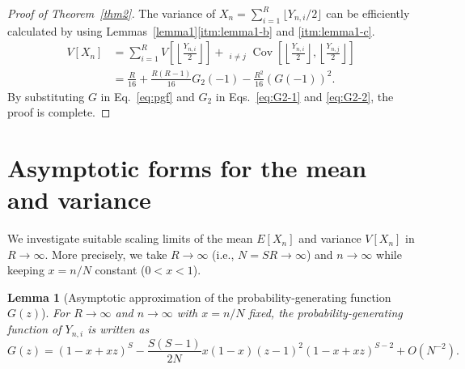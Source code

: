 \documentclass[pre, amsmath, floatfix]{revtex4-2}
\theoremstyle{plain}
\newtheorem{lemma}{Lemma}[section]
\theoremstyle{definition}
\theoremstyle{remark}
\newcommand{\E}[1]{E\left[#1\right]} %
\newcommand{\Var}[1]{V\left[#1\right]} %
\DeclareMathOperator{\cov}{Cov} %
\newcommand{\Cov}[2]{\cov\left[#1, #2\right]}
\newcommand{\Omicron}{O}
\begin{document}
\begin{proof}[Proof of Theorem~\ref{thm2}]
The variance of $X_n=\sum_{i=1}^R\lfloor Y_{n,i}/2\rfloor$ can be efficiently calculated by using Lemmas~\ref{lemma1}\ref{itm:lemma1-b} and \ref{itm:lemma1-c}.
\begin{align}
\Var{X_n}&=\sum_{i=1}^R \Var{\left\lfloor\frac{Y_{n,i}}{2}\right\rfloor}+\mathop{\sum_{i=1}^R\sum_{j=1}^R}_{i\ne j}\Cov{\left\lfloor\frac{Y_{n,i}}{2}\right\rfloor}{\left\lfloor\frac{Y_{n,j}}{2}\right\rfloor}\nonumber\\
&=\frac{R}{16}+\frac{R(R-1)}{16}G_2(-1)-\frac{R^2}{16}(G(-1))^2.
\label{eq:proof_V}
\end{align}
By substituting $G$ in Eq.~\eqref{eq:pgf} and $G_2$ in Eqs.~\eqref{eq:G2-1} and \eqref{eq:G2-2}, the proof is complete.
\end{proof}

\section{Asymptotic forms for the mean and variance}
We investigate suitable scaling limits of the mean $\E{X_n}$ and variance $\Var{X_n}$ in $R\to\infty$.
More precisely, we take $R\to\infty$ (i.e., $N=SR\to\infty$) and $n\to\infty$ while keeping $x=n/N$ constant ($0<x<1$).

\begin{lemma}[Asymptotic approximation of the probability-generating function $G(z)$]\label{lemma2}
For $R\to\infty$ and $n\to\infty$ with $x=n/N$ fixed, the probability-generating function of $Y_{n,i}$ is written as
\begin{equation}
G(z)=(1-x+xz)^S-\frac{S(S-1)}{2N}x(1-x)(z-1)^2(1-x+xz)^{S-2}+\Omicron(N^{-2}).
\label{eq:G_asymptotic}
\end{equation}
\end{lemma}
\end{document}
